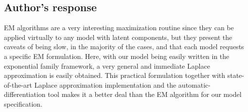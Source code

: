 \documentclass[a4paper,12pt]{article}
\begin{document}
\subsection*{Author's response}

EM algorithms are a very interesting maximization routine since they can
be applied virtually to any model with latent components, but they
present the caveats of being slow, in the majority of the cases, and
that each model requests a specific EM formulation. Here, with our model
being easily written in the exponential family framework, a very general
and immediate Laplace approximation is easily obtained. This practical
formulation together with state-of-the-art Laplace approximation
implementation and the automatic-differentiation tool makes it a better
deal than the EM algorithm for our model specification.

 
\end{document}
